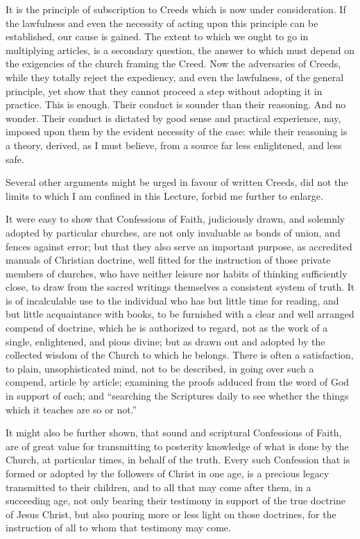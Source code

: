 \documentclass[
]{book}
\begin{document}
It is the principle of subscription to Creeds which is now under consideration. If the lawfulness and even the necessity of acting upon this principle can be established, our cause is gained. The extent to which we ought to go in multiplying articles, is a secondary question, the answer to which must depend on the exigencies of the church framing the Creed. Now the adversaries of Creeds, while they totally reject the expediency, and even the lawfulness, of the general principle, yet show that they cannot proceed a step without adopting it in practice. This is enough. Their conduct is sounder than their reasoning. And no wonder. Their conduct is dictated by good sense and practical experience, nay, imposed upon them by the evident necessity of the case: while their reasoning is a theory, derived, as I must believe, from a source far less enlightened, and less safe.

Several other arguments might be urged in favour of written Creeds, did not the limits to which I am confined in this Lecture, forbid me further to enlarge.

It were easy to show that Confessions of Faith, judiciously drawn, and solemnly adopted by particular churches, are not only invaluable as bonds of union, and fences against error; but that they also serve an important purpose, as accredited manuals of Christian doctrine, well fitted for the instruction of those private members of churches, who have neither leisure nor habits of thinking sufficiently close, to draw from the sacred writings themselves a consistent system of truth. It is of incalculable use to the individual who has but little time for reading, and but little acquaintance with books, to be furnished with a clear and well arranged compend of doctrine, which he is authorized to regard, not as the work of a single, enlightened, and pious divine; but as drawn out and adopted by the collected wisdom of the Church to which he belongs. There is often a satisfaction, to plain, unsophisticated mind, not to be described, in going over such a compend, article by article; examining the proofs adduced from the word of God in support of each; and ``searching the Scriptures daily to see whether the things which it teaches are so or not.''

It might also be further shown, that sound and scriptural Confessions of Faith, are of great value for transmitting to posterity knowledge of what is done by the Church, at particular times, in behalf of the truth. Every such Confession that is formed or adopted by the followers of Christ in one age, is a precious legacy transmitted to their children, and to all that may come after them, in a succeeding age, not only bearing their testimony in support of the true doctrine of Jesus Christ, but also pouring more or less light on those doctrines, for the instruction of all to whom that testimony may come.
\end{document}

